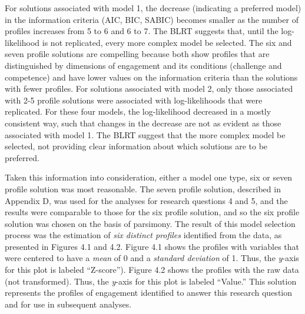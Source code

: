 \documentclass[]{msu-thesis}
\theoremstyle{definition}
\theoremstyle{definition}
\theoremstyle{definition}
\theoremstyle{remark}
\begin{document}
For solutions associated with model 1, the decrease (indicating a
preferred model) in the information criteria (AIC, BIC, SABIC) becomes
smaller as the number of profiles increases from 5 to 6 and 6 to 7. The
BLRT suggests that, until the log-likelihood is not replicated, every
more complex model be selected. The six and seven profile solutions are
compelling because both show profiles that are distinguished by
dimensions of engagement and its conditions (challenge and competence)
and have lower values on the information criteria than the solutions
with fewer profiles. For solutions associated with model 2, only those
associated with 2-5 profile solutions were associated with
log-likelihoods that were replicated. For these four models, the
log-likelihood decreased in a mostly consistent way, such that changes
in the decrease are not as evident as those associated with model 1. The
BLRT suggest that the more complex model be selected, not providing
clear information about which solutions are to be preferred.

Taken this information into consideration, either a model one type, six
or seven profile solution was most reasonable. The seven profile
solution, described in Appendix D, was used for the analyses for
research questions 4 and 5, and the results were comparable to those for
the six profile solution, and so the six profile solution was chosen on
the basis of parsimony. The result of this model selection process was
the estimation of \emph{six distinct profiles} identified from the data,
as presented in Figures 4.1 and 4.2. Figure 4.1 shows the profiles with
variables that were centered to have a \emph{mean} of 0 and a
\emph{standard deviation} of 1. Thus, the \emph{y}-axis for this plot is
labeled ``Z-score''). Figure 4.2 shows the profiles with the raw data
(not transformed). Thus, the \emph{y}-axis for this plot is labeled
``Value.'' This solution represents the profiles of engagement
identified to answer this research question and for use in subsequent
analyses.
\end{document}
